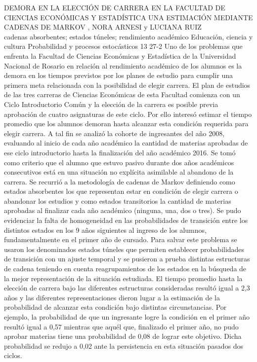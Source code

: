 \A
{DEMORA EN LA ELECCIÓN DE CARRERA EN LA FACULTAD DE CIENCIAS ECONÓMICAS Y ESTADÍSTICA UNA ESTIMACIÓN MEDIANTE CADENAS DE MARKOV}
{, NORA ARNESI y LUCIANA RUIZ}
{
\\}
{cadenas absorbentes; estados túneles; rendimiento académico} 
 {Educación, ciencia y cultura} 
 {Probabilidad y procesos estocásticos} 
 {13} 
 {27-2}
{Uno de los problemas que enfrenta la Facultad de Ciencias Económicas y Estadística de la Universidad Nacional de Rosario en relación al rendimiento académico de los alumnos es la demora en los tiempos previstos por los planes de estudio para cumplir una primera meta relacionada con la posibilidad de elegir carrera. El plan de estudios de las tres carreras de Ciencias Económicas de esta Facultad comienza con un Ciclo Introductorio Común y la elección de la carrera es posible previa aprobación de cuatro asignaturas de este ciclo. Por ello interesó estimar el tiempo promedio que los alumnos demoran hasta alcanzar esta condición requerida para elegir carrera. A tal fin se analizó la cohorte de ingresantes del año 2008, evaluando al inicio de cada año académico la cantidad de materias aprobadas de ese ciclo introductorio hasta la finalización del año académico 2016. Se tomó como criterio que el alumno que estuvo pasivo durante dos años académicos consecutivos está en una situación no explícita asimilable al abandono de la carrera. Se recurrió a la metodología de cadenas de Markov definiendo como estados absorbentes los que representan estar en condición de elegir carrera o abandonar los estudios y como estados transitorios la cantidad de materias aprobadas al finalizar cada año académico (ninguna, una, dos o tres). Se pudo evidenciar la falta de homogeneidad en las probabilidades de transición entre los distintos estados en los 9 años siguientes al ingreso de los alumnos, fundamentalmente en el primer año de cursado. Para salvar este problema se usaron los denominados estados túneles que permiten establecer probabilidades de transición con un ajuste temporal y se pusieron a prueba distintas estructuras de cadena teniendo en cuenta reagrupamientos de los estados en la búsqueda de la mejor representación de la situación estudiada. El tiempo promedio hasta la elección de carrera bajo las diferentes estructuras consideradas resultó igual a 2,3 años y las diferentes representaciones dieron lugar a la estimación de la probabilidad de alcanzar esta condición bajo distintas circunstancias. Por ejemplo, la probabilidad de que un ingresante logre la condición en el primer año resultó igual a 0,57 mientras que aquél que, finalizado el primer año, no pudo aprobar materias tiene una probabilidad de 0,08 de lograr este objetivo. Dicha probabilidad se redujo a 0,02 ante la persistencia en esta situación pasados dos ciclos.}
